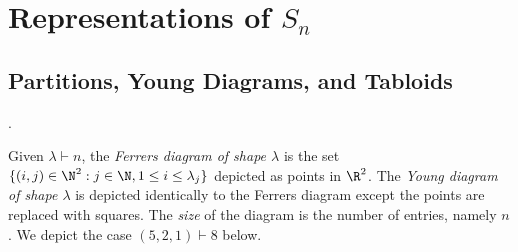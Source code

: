 \documentclass[../main.tex]{subfiles}
\begin{document}
\section{Representations of $ S_{n} $}
\cite{fultonharris}

\subsection{Partitions, Young Diagrams, and Tabloids}.
\begin{definition}\label{def:youngdiagram}
  Given $ \lambda\vdash n $, the \textit{Ferrers diagram of shape $ \lambda $} is the set $\{(i,j)\in \N^{2} : j\in \N, 1\leq i \leq \lambda_{j}\}$ depicted as points in $ \R^{2} $. The \textit{Young diagram of shape $ \lambda $} is depicted identically to the Ferrers diagram except the points are replaced with squares. The \textit{size} of the diagram is the number of entries, namely $ n $. We depict the case $ (5,2,1)\vdash 8 $ below.
\end{definition}
\end{document}
